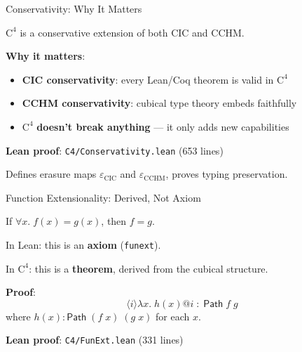 \documentclass[aspectratio=169,11pt]{beamer}
\newcommand{\Cfour}{\mathrm{C}^4}
\newcommand{\Path}{\mathsf{Path}}
\begin{document}
\begin{frame}{Conservativity: Why It Matters}
\begin{theorem}
$\Cfour$ is a conservative extension of both CIC and CCHM.
\end{theorem}

\vspace{0.5em}
\textbf{Why it matters}:
\begin{itemize}
\item \textbf{CIC conservativity}: every Lean/Coq theorem is valid in $\Cfour$
\item \textbf{CCHM conservativity}: cubical type theory embeds faithfully
\item $\Cfour$ \textbf{doesn't break anything} --- it only adds new capabilities
\end{itemize}

\vspace{0.5em}
\textbf{Lean proof}: \texttt{C4/Conservativity.lean} (653 lines)

Defines erasure maps $\varepsilon_{\text{CIC}}$ and $\varepsilon_{\text{CCHM}}$, proves typing preservation.
\end{frame}

\begin{frame}{Function Extensionality: Derived, Not Axiom}
\begin{theorem}
If $\forall x.\; f(x) = g(x)$, then $f = g$.
\end{theorem}

\vspace{0.5em}
In Lean: this is an \textbf{axiom} (\texttt{funext}).

In $\Cfour$: this is a \textbf{theorem}, derived from the cubical structure.

\vspace{0.5em}
\textbf{Proof}:
\[
\langle i \rangle \lambda x.\; h(x) @ i \;:\; \Path\;f\;g
\]
where $h(x) : \Path\;(f\;x)\;(g\;x)$ for each $x$.

\vspace{0.3em}
\textbf{Lean proof}: \texttt{C4/FunExt.lean} (331 lines)
\end{frame}
\end{document}
